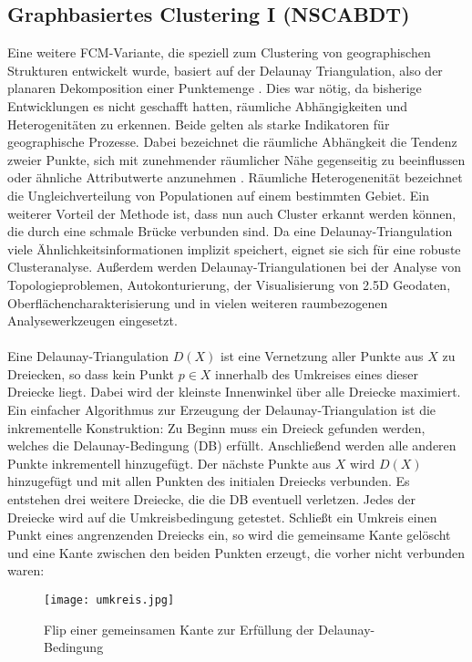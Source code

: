 \documentclass[11pt,ceqn]{book}
\begin{document}
\subsection{Graphbasiertes Clustering I (NSCABDT)}
Eine weitere FCM-Variante, die speziell zum Clustering von geographischen Strukturen entwickelt wurde, basiert auf der Delaunay Triangulation, also der planaren Dekomposition einer Punktemenge \cite{nscabdt}. Dies war nötig, da bisherige Entwicklungen es nicht geschafft hatten, räumliche Abhängigkeiten und Heterogenitäten zu erkennen. Beide gelten als starke Indikatoren für geographische Prozesse. Dabei bezeichnet die räumliche Abhängkeit die Tendenz zweier Punkte, sich mit zunehmender räumlicher Nähe gegenseitig zu beeinflussen oder ähnliche Attributwerte anzunehmen \cite{dependency}. Räumliche Heterogenenität bezeichnet die Ungleichverteilung von Populationen auf einem bestimmten Gebiet. Ein weiterer Vorteil der Methode ist, dass nun auch Cluster erkannt werden können, die durch eine schmale Brücke verbunden sind. Da eine Delaunay-Triangulation viele Ähnlichkeitsinformationen implizit speichert, eignet sie sich für eine robuste Clusteranalyse. Außerdem werden Delaunay-Triangulationen bei der Analyse von Topologieproblemen, Autokonturierung, der Visualisierung von 2.5D Geodaten, Oberflächencharakterisierung und in vielen weiteren raumbezogenen Analysewerkzeugen eingesetzt.
\\~\\
Eine Delaunay-Triangulation $D(X)$ ist eine Vernetzung aller Punkte aus $X$ zu Dreiecken, so dass kein Punkt $p\in X$ innerhalb des Umkreises eines dieser Dreiecke liegt. Dabei wird der kleinste Innenwinkel über alle Dreiecke maximiert.
\\
Ein einfacher Algorithmus zur Erzeugung der Delaunay-Triangulation ist die inkrementelle Konstruktion:
Zu Beginn muss ein Dreieck gefunden werden, welches die Delaunay-Bedingung (DB) erfüllt. Anschließend werden alle anderen Punkte inkrementell hinzugefügt. Der nächste Punkte aus $X$ wird $D(X)$ hinzugefügt und mit allen Punkten des initialen Dreiecks verbunden. Es entstehen drei weitere Dreiecke, die die DB eventuell verletzen. Jedes der Dreiecke wird auf die Umkreisbedingung getestet. Schließt ein Umkreis einen Punkt eines angrenzenden Dreiecks ein, so wird die gemeinsame Kante gelöscht und eine Kante zwischen den beiden Punkten erzeugt, die vorher nicht verbunden waren:

\begin{figure}[H]
\centering
\texttt{[image: umkreis.jpg]}
\caption{Flip einer gemeinsamen Kante zur Erfüllung der Delaunay-Bedingung}
\end{figure}
\end{document}
